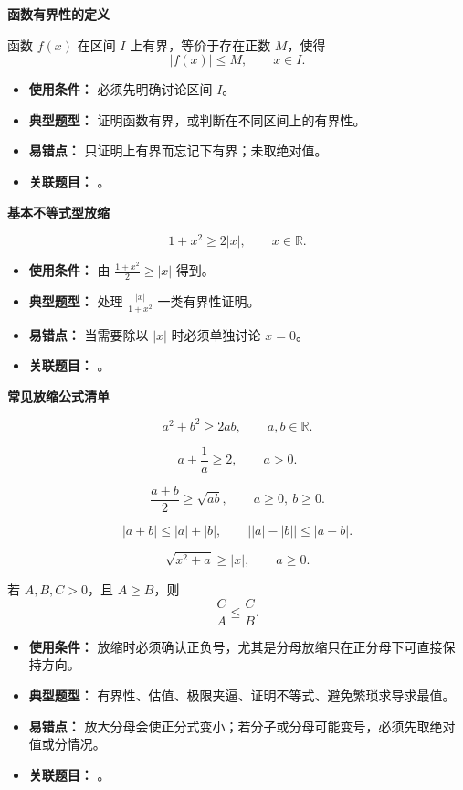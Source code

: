\begin{knowledgeBox}
\textbf{函数有界性的定义}

函数 \(f(x)\) 在区间 \(I\) 上有界，等价于存在正数 \(M\)，使得
\[
|f(x)|\le M,\qquad x\in I.
\]

\begin{itemize}
  \item \textbf{使用条件：} 必须先明确讨论区间 \(I\)。
  \item \textbf{典型题型：} 证明函数有界，或判断在不同区间上的有界性。
  \item \textbf{易错点：} 只证明上有界而忘记下有界；未取绝对值。
  \item \textbf{关联题目：} 。
\end{itemize}

\textbf{基本不等式型放缩}

\[
1+x^2\ge 2|x|,\qquad x\in\mathbb{R}.
\]

\begin{itemize}
  \item \textbf{使用条件：} 由 \(\frac{1+x^2}{2}\ge |x|\) 得到。
  \item \textbf{典型题型：} 处理 \(\frac{|x|}{1+x^2}\) 一类有界性证明。
  \item \textbf{易错点：} 当需要除以 \(|x|\) 时必须单独讨论 \(x=0\)。
  \item \textbf{关联题目：} 。
\end{itemize}

\textbf{常见放缩公式清单}

\[
a^2+b^2\ge 2ab,\qquad a,b\in\mathbb{R}.
\]

\[
a+\frac1a\ge 2,\qquad a>0.
\]

\[
\frac{a+b}{2}\ge \sqrt{ab},\qquad a\ge0,\ b\ge0.
\]

\[
|a+b|\le |a|+|b|,\qquad
\bigl||a|-|b|\bigr|\le |a-b|.
\]

\[
\sqrt{x^2+a}\ge |x|,\qquad a\ge0.
\]

若 \(A,B,C>0\)，且 \(A\ge B\)，则
\[
\frac{C}{A}\le \frac{C}{B}.
\]

\begin{itemize}
  \item \textbf{使用条件：} 放缩时必须确认正负号，尤其是分母放缩只在正分母下可直接保持方向。
  \item \textbf{典型题型：} 有界性、估值、极限夹逼、证明不等式、避免繁琐求导求最值。
  \item \textbf{易错点：} 放大分母会使正分式变小；若分子或分母可能变号，必须先取绝对值或分情况。
  \item \textbf{关联题目：} 。
\end{itemize}


\end{knowledgeBox}
